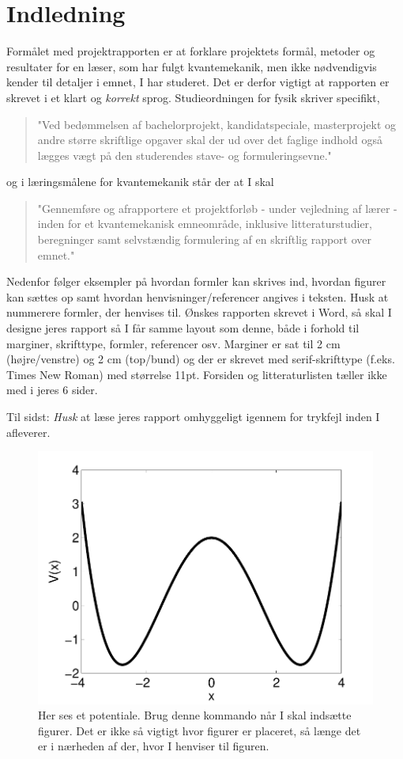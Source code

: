 \documentclass[danish,a4paper,oneside,onecolumn,article,11pt]{memoir}
\begin{document}
\chapter{Indledning}
Formålet med projektrapporten er at forklare projektets formål,
metoder og resultater for en læser, som har fulgt kvantemekanik, men
ikke nødvendigvis kender til detaljer i emnet, I har studeret. Det er
derfor vigtigt at rapporten er skrevet i et klart og \emph{korrekt}
sprog. Studieordningen for fysik skriver specifikt,

\begin{quote}
  "Ved bedømmelsen af bachelorprojekt, kandidatspeciale, masterprojekt
  og andre større skriftlige opgaver skal der ud over det faglige
  indhold også lægges vægt på den studerendes stave- og
  formuleringsevne."  
\end{quote}
og i læringsmålene for kvantemekanik står der at I skal
\begin{quote}
  "Gennemføre og afrapportere et projektforløb - under vejledning af
  lærer - inden for et kvantemekanisk emneområde, inklusive
  litteraturstudier, beregninger samt selvstændig formulering af en
  skriftlig rapport over emnet."  
\end{quote}


Nedenfor følger eksempler på hvordan formler kan skrives ind, hvordan
figurer kan sættes op samt hvordan henvisninger/referencer angives i
teksten. Husk at nummerere formler, der henvises til.  Ønskes
rapporten skrevet i Word, så skal I designe jeres rapport så I får
samme layout som denne, både i forhold til marginer, skrifttype,
formler, referencer osv. Marginer er sat til 2 cm (højre/venstre) og 2
cm (top/bund) og der er skrevet med serif-skrifttype (f.eks. Times New
Roman) med størrelse 11pt. Forsiden og litteraturlisten tæller ikke
med i jeres 6 sider.

Til sidst: \emph{Husk} at læse jeres rapport omhyggeligt igennem for
trykfejl inden I afleverer.

\begin{figure}
\begin{center}
\includegraphics[width=0.5\columnwidth]{potential}
\caption{Her ses et potentiale. Brug denne kommando når I skal
  indsætte figurer. Det er ikke så vigtigt hvor figurer er placeret,
  så længe det er i nærheden af der, hvor I henviser til figuren.}
\label{fig:pot}
\end{center}
\end{figure}
\end{document}
